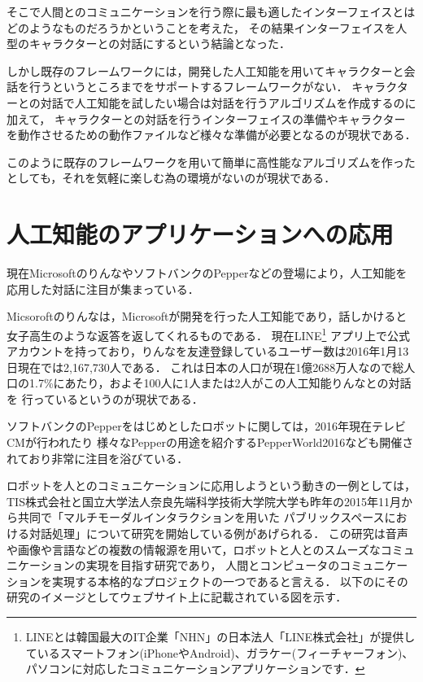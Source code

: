 そこで人間とのコミュニケーションを行う際に最も適したインターフェイスとはどのようなものだろうかということを考えた，
その結果インターフェイスを人型のキャラクターとの対話にするという結論となった．

しかし既存のフレームワークには，開発した人工知能を用いてキャラクターと会話を行うというところまでをサポートするフレームワークがない．
キャラクターとの対話で人工知能を試したい場合は対話を行うアルゴリズムを作成するのに加えて，
キャラクターとの対話を行うインターフェイスの準備やキャラクターを動作させるための動作ファイルなど様々な準備が必要となるのが現状である．

このように既存のフレームワークを用いて簡単に高性能なアルゴリズムを作ったとしても，それを気軽に楽しむ為の環境がないのが現状である．

\section{人工知能のアプリケーションへの応用}
現在Microsoftのりんな\cite{rinna}やソフトバンクのPepper\cite{Pepper}などの登場により，人工知能を応用した対話に注目が集まっている．

Micsoroftのりんなは，Microsoftが開発を行った人工知能であり，話しかけると女子高生のような返答を返してくれるものである．
現在LINE\footnote{LINEとは韓国最大のIT企業「NHN」の日本法人「LINE株式会社」が提供しているスマートフォン(iPhoneやAndroid)、ガラケー(フィーチャーフォン)、パソコンに対応したコミュニケーションアプリケーションです．\cite{line}}
アプリ上で公式アカウントを持っており，りんなを友達登録しているユーザー数は2016年1月13日現在では2,167,730人である．
これは日本の人口が現在1億2688万人\cite{humen}なので総人口の1.7\%にあたり，およそ100人に1人または2人がこの人工知能りんなとの対話を
行っているというのが現状である．

ソフトバンクのPepperをはじめとしたロボットに関しては，2016年現在テレビCMが行われたり
様々なPepperの用途を紹介するPepperWorld2016\cite{Pepper2}なども開催されており非常に注目を浴びている．

ロボットを人とのコミュニケーションに応用しようという動きの一例としては，
TIS株式会社と国立大学法人奈良先端科学技術大学院大学も昨年の2015年11月から共同で「マルチモーダルインタラクションを用いた
パブリックスペースにおける対話処理」について研究を開始している例があげられる．\cite{tis}
この研究は音声や画像や言語などの複数の情報源を用いて，ロボットと人とのスムーズなコミュニケーションの実現を目指す研究であり，
人間とコンピュータのコミュニケーションを実現する本格的なプロジェクトの一つであると言える．
以下のにその研究のイメージとしてウェブサイト上に記載されている図を示す．

